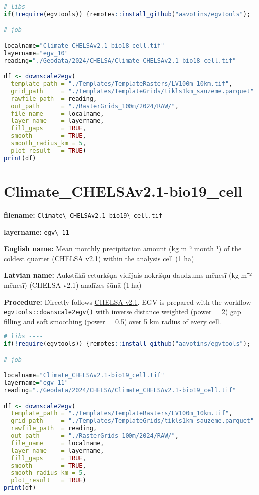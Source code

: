 \documentclass[
]{book}
\newcommand{\passthrough}[1]{#1}
\begin{document}
\begin{lstlisting}[language=R]
# libs ----
if(!require(egvtools)) {remotes::install_github("aavotins/egvtools"); require(egvtools)}

# job ----

localname="Climate_CHELSAv2.1-bio18_cell.tif"
layername="egv_10"
reading="./Geodata/2024/CHELSA/Climate_CHELSAv2.1-bio18_cell.tif"

df <- downscale2egv(
  template_path = "./Templates/TemplateRasters/LV100m_10km.tif",
  grid_path     = "./Templates/TemplateGrids/tikls1km_sauzeme.parquet",
  rawfile_path  = reading,
  out_path      = "./RasterGrids_100m/2024/RAW/",
  file_name     = localname,
  layer_name    = layername,
  fill_gaps     = TRUE,
  smooth        = TRUE,
  smooth_radius_km = 5,
  plot_result   = TRUE)
print(df)
\end{lstlisting}

\section{Climate\_CHELSAv2.1-bio19\_cell}\label{ch06.011}

\textbf{filename:} \passthrough{\lstinline!Climate\_CHELSAv2.1-bio19\_cell.tif!}

\textbf{layername:} \passthrough{\lstinline!egv\_11!}

\textbf{English name:} Mean monthly precipitation amount (kg m⁻² month⁻¹) of the coldest quarter (CHELSA v2.1) within the analysis cell (1 ha)

\textbf{Latvian name:} Aukstākā ceturkšņa vidējais nokrišņu daudzums mēnesī (kg m⁻² mēnesī) (CHELSA v2.1) analīzes šūnā (1 ha)

\textbf{Procedure:} Directly follows \hyperref[Ch04.11]{CHELSA v2.1}. EGV is prepared with the
workflow \passthrough{\lstinline!egvtools::downscale2egv()!} with inverse distance weighted (power = 2)
gap filling and soft smoothing (power = 0.5) over 5 km radius of every cell.

\begin{lstlisting}[language=R]
# libs ----
if(!require(egvtools)) {remotes::install_github("aavotins/egvtools"); require(egvtools)}

# job ----

localname="Climate_CHELSAv2.1-bio19_cell.tif"
layername="egv_11"
reading="./Geodata/2024/CHELSA/Climate_CHELSAv2.1-bio19_cell.tif"

df <- downscale2egv(
  template_path = "./Templates/TemplateRasters/LV100m_10km.tif",
  grid_path     = "./Templates/TemplateGrids/tikls1km_sauzeme.parquet",
  rawfile_path  = reading,
  out_path      = "./RasterGrids_100m/2024/RAW/",
  file_name     = localname,
  layer_name    = layername,
  fill_gaps     = TRUE,
  smooth        = TRUE,
  smooth_radius_km = 5,
  plot_result   = TRUE)
print(df)
\end{lstlisting}
\end{document}
